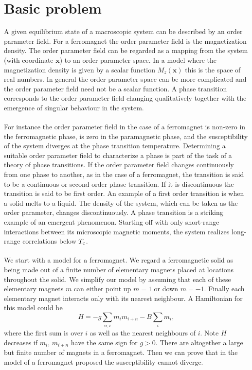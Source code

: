 \section{Basic problem}
A given equilibrium state of a macroscopic system can be described by an order parameter field. For a ferromagnet the order parameter field is the magnetization density. 
The order parameter field can be regarded as a mapping from the system (with coordinate $\bm{x}$) to an order parameter space. In a model where the magnetization density is given by a scalar function $M_z(\bm{x})$ this is the space of real numbers. In general the order parameter space can be more complicated and the order parameter field need not be a scalar function.
A phase transition corresponds to the order parameter field
changing qualitatively together with the emergence of singular behaviour in the system.
\\ \\
For instance the order parameter field in the case of a ferromagnet is non-zero in the ferromagnetic phase, is zero in the paramagnetic phase, and the susceptibility of the system diverges at the phase transition temperature. 
Determining a suitable order parameter field to characterize a phase is part of the task of a theory of phase transitions. If the order parameter field changes continuously from one phase to another, as in the case of a ferromagnet, the transition is said to be a continuous or second-order phase transition. If it is discontinuous the transition is said to be first order. 
An example of a first order transition is when a solid melts
to a liquid. The density of the system, which can be taken as the order parameter, changes discontinuously. A phase transition is a striking example of an emergent phenomenon. Starting off with only short-range interactions between its microscopic magnetic moments, the system realizes long-range correlations below $T_{\rm c}$.
\\ \\
We start with a model for a ferromagnet. We regard a ferromagnetic solid as being made out of a finite number of elementary magnets placed at locations throughout the solid.
We simplify our model by assuming that each of these elementary magnets $m$ can either point up $m = 1$ or down $m = -1$. Finally each elementary magnet interacts only with its nearest neighbour. A Hamiltonian for this model could be
\[H = -g\sum_{n,i}m_im_{i+n} - B\sum_i m_i,\]
where the first sum is over $i$ as well as the nearest neighbours of $i$. Note $H$ decreases if $m_i$, $m_{i+n}$ have the same sign for $g > 0$. There are altogether a large but finite number of magnets in a ferromagnet. Then we can prove that in the model of a ferromagnet proposed the susceptibility cannot diverge. 
